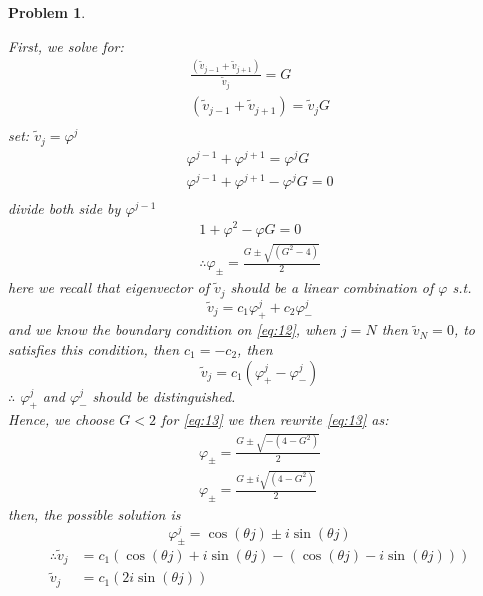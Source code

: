 \documentclass[a4paper,12pt]{article}
\newtheorem{prob}{Problem}[]
\begin{document}
\begin{prob}
\begin{enumerate}[label=(\alph*)]
		First, we solve for:
		\begin{equation*}
		\begin{aligned}
		\frac{( \tilde{v}_{j-1} +\tilde{v}_{j+1})}{\tilde{v}_j} = G\\
		( \tilde{v}_{j-1} +\tilde{v}_{j+1}) = \tilde{v}_j G\\
		\end{aligned}
		\end{equation*}
		set: $\tilde{v}_j = \varphi^j$
		\begin{equation*}
		\begin{aligned}
		\varphi^{j-1} + \varphi^{j+1} = \varphi^j G\\
		\varphi^{j-1} + \varphi^{j+1} - \varphi^j G = 0\\
		\end{aligned}
		\end{equation*}
		divide both side by $\varphi^{j-1}$
		\begin{equation}\label{eq:13}
		\begin{aligned}
		1 + \varphi^2 - \varphi G = 0\\
		\therefore \varphi_\pm = \frac{G \pm \sqrt{(G^2 - 4)}}{2}
		\end{aligned}
		\end{equation}
		here we recall that eigenvector of $\tilde{v}_j$ should be a linear combination of $\varphi$ s.t. $$\tilde{v}_j = c_1\varphi_+^j + c_2\varphi_-^j$$
		and we know the boundary condition on \eqref{eq:12}, when $j=N$ then $\tilde{v}_N=0$, to satisfies this condition, then $c_1 = -c_2$, then $$\tilde{v}_j = c_1(\varphi_+^j - \varphi_-^j)$$ $\therefore$ $\varphi_+^j$ and $\varphi_-^j$ should be distinguished.\\
		Hence, we choose $G<2$ for \eqref{eq:13} we then rewrite \eqref{eq:13} as:
		\begin{equation*}
		\begin{aligned}
		\varphi_\pm = \frac{G \pm \sqrt{-(4-G^2)}}{2}\\
		\varphi_\pm = \frac{G \pm i\sqrt{(4-G^2)}}{2}
		\end{aligned}
		\end{equation*}
		then, the possible solution is $$\varphi_\pm^j = \cos(\theta j) \pm i \sin(\theta j)$$
		\begin{equation*}
		\begin{aligned}
		\therefore \tilde{v}_j &= c_1(\cos(\theta j) + i \sin(\theta j) - (\cos(\theta j) - i \sin(\theta j)))\\
		\tilde{v}_j &= c_1(2 i \sin(\theta j))

\end{aligned}
\end{equation*}
\end{enumerate}
\end{prob}
\end{document}
